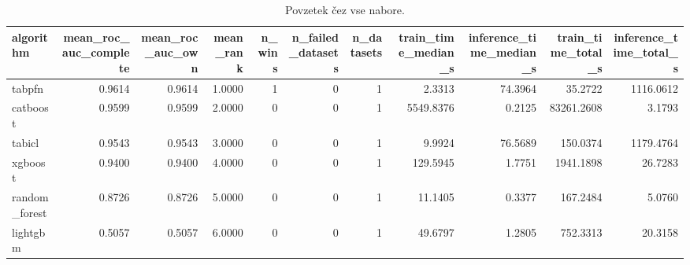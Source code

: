 \begin{table}[htbp]
\centering
\caption{Povzetek čez vse nabore.}
\label{tab:overall}
\begin{tabular}{lrrrrrrrrrr}
\hline
algorithm & mean\_roc\_auc\_complete & mean\_roc\_auc\_own & mean\_rank & n\_wins & n\_failed\_datasets & n\_datasets & train\_time\_median\_s & inference\_time\_median\_s & train\_time\_total\_s & inference\_time\_total\_s \\
\hline
tabpfn & 0.9614 & 0.9614 & 1.0000 & 1 & 0 & 1 & 2.3313 & 74.3964 & 35.2722 & 1116.0612 \\
catboost & 0.9599 & 0.9599 & 2.0000 & 0 & 0 & 1 & 5549.8376 & 0.2125 & 83261.2608 & 3.1793 \\
tabicl & 0.9543 & 0.9543 & 3.0000 & 0 & 0 & 1 & 9.9924 & 76.5689 & 150.0374 & 1179.4764 \\
xgboost & 0.9400 & 0.9400 & 4.0000 & 0 & 0 & 1 & 129.5945 & 1.7751 & 1941.1898 & 26.7283 \\
random\_forest & 0.8726 & 0.8726 & 5.0000 & 0 & 0 & 1 & 11.1405 & 0.3377 & 167.2484 & 5.0760 \\
lightgbm & 0.5057 & 0.5057 & 6.0000 & 0 & 0 & 1 & 49.6797 & 1.2805 & 752.3313 & 20.3158 \\
\hline
\end{tabular}
\end{table}
